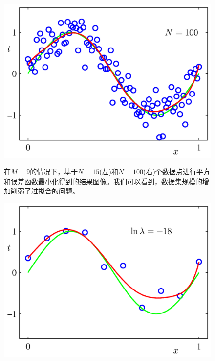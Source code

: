 \documentclass[b5paper]{book}
\numberwithin{equation}{chapter}
\begin{document}
{\begin{figure}[ht]
\begin{minipage}[t]{0.5\linewidth}
		\label{fig:1-6a}
		\end{minipage}
		\begin{minipage}[t]{0.5\linewidth}
		\includegraphics[scale=0.8]{Images/1-6b.png}
		\label{fig:1-6b}
		\end{minipage}
		\caption{在$M=9$的情况下，基于$N=15$(左)和$N=100$(右)个数据点进行平方和误差函数最小化得到的结果图像。我们可以看到，数据集规模的增加削弱了过拟合的问题。}
	\end{figure}
	\begin{figure}[H]
		\begin{minipage}[t]{0.5\linewidth}
		\includegraphics[scale=0.8]{Images/1-7a.png}
		\label{fig:1-7a}
		\end{minipage}

\end{figure}}
\end{document}

